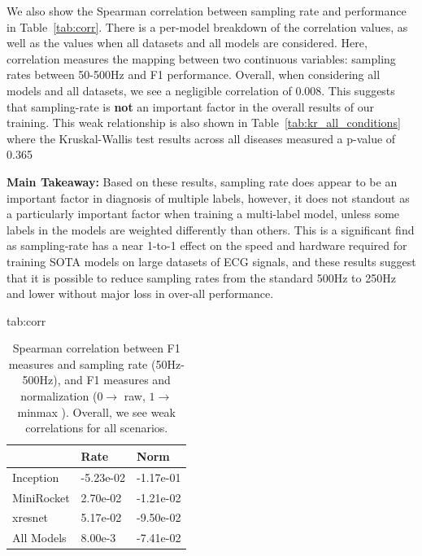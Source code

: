 \documentclass[pmlr,twocolumn]{jmlr}%
\begin{document}
We also show the Spearman correlation between sampling rate and performance in Table~\ref{tab:corr}. There is a per-model breakdown of the correlation values, as well as the values when all datasets and all models are considered. Here, correlation measures the mapping between two continuous variables: sampling rates between 50-500Hz and F1 performance. Overall, when considering all models and all datasets, we see a negligible correlation of $0.008$. This suggests that sampling-rate is \textbf{not} an important factor in the overall results of our training. This weak relationship is also shown in   Table~\ref{tab:kr_all_conditions} where the Kruskal-Wallis test results across all diseases measured a p-value of 0.365


\textbf{Main Takeaway:} Based on these results, sampling rate does appear to be an important factor in diagnosis of multiple labels, however, it does not standout as a particularly important factor when training a multi-label model, unless some labels in the models are weighted differently than others. This is a significant find as sampling-rate has a near 1-to-1 effect on the speed and hardware required for training SOTA models on large datasets of ECG signals, and these results suggest that it is possible to reduce sampling rates from the standard 500Hz to 250Hz and lower without major loss in over-all performance. 

\begin{table}[htbp]
\floatconts
  {tab:corr}
  {\caption{Spearman correlation between F1 measures and sampling rate (50Hz-500Hz), and F1 measures and normalization ($0 \xrightarrow{}$ raw, $1 \xrightarrow{} $ minmax ). Overall, we see weak correlations for all scenarios.}}
  {\begin{tabular}{|l|l|l|}
  \hline
   & \bfseries Rate & \bfseries Norm \\\hline
  
  Inception  & -5.23e-02 & -1.17e-01  \\
  MiniRocket &  2.70e-02 & -1.21e-02  \\
  xresnet    & 5.17e-02 & -9.50e-02 \\
  \hline
  All Models & 8.00e-3 & -7.41e-02\\
  \hline
  \end{tabular}}
\end{table}
\end{document}
